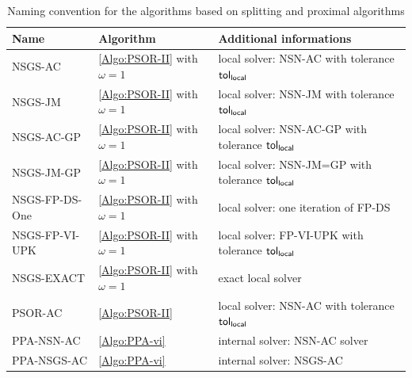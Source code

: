 \begin{table}
  \centering
  \begin{tabular}{|l|l|p{}|}
    \hline
    Name
    & Algorithm
    & Additional informations
    \\
    \hline
    \sf NSGS-AC
    & \ref{Algo:PSOR-II} with $\omega=1$
    & local solver: NSN-AC with tolerance $\sf tol_{local}$
    \\
    \hline
    \sf NSGS-JM
    & \ref{Algo:PSOR-II} with $\omega=1$
    & local solver: NSN-JM with tolerance $\sf tol_{local}$
    \\
    \hline
    \sf NSGS-AC-GP
    & \ref{Algo:PSOR-II} with $\omega=1$ 
    & local solver: NSN-AC-GP with tolerance $\sf tol_{local}$
    \\
    \hline
    \sf NSGS-JM-GP
    & \ref{Algo:PSOR-II} with $\omega=1$ 
    & local solver: NSN-JM=GP with tolerance $\sf tol_{local}$
    \\
    \hline
    \sf NSGS-FP-DS-One
    & \ref{Algo:PSOR-II} with $\omega=1$
    & local solver: one iteration of FP-DS
    \\
    \hline
    \sf NSGS-FP-VI-UPK
    & \ref{Algo:PSOR-II} with $\omega=1$
    & local solver: FP-VI-UPK with tolerance $\sf tol_{local}$
    \\
    \hline
    \sf NSGS-EXACT
    & \ref{Algo:PSOR-II} with $\omega=1$ 
    & exact local solver
    \\
    \hline
    \hline
    \sf PSOR-AC 
    &  \ref{Algo:PSOR-II} 
    & local solver: NSN-AC with tolerance $\sf tol_{local}$
    \\
    \hline
    \hline
    \sf PPA-NSN-AC 
    &  \ref{Algo:PPA-vi} 
    & internal solver: NSN-AC solver
    \\
    \hline
    \sf PPA-NSGS-AC
    &  \ref{Algo:PPA-vi} 
    & internal solver: NSGS-AC
    \\
    \hline
  \end{tabular}
  \caption{Naming convention for the algorithms based on splitting and proximal algorithms}
  \label{tab:PSOR-PPA-algos}
\end{table}


